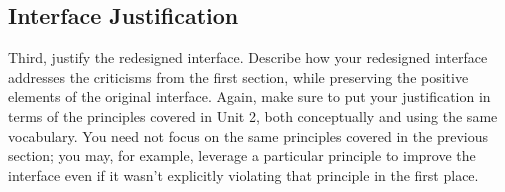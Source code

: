\documentclass[12pt,letterpaper]{article}
\begin{document}
\subsection*{Interface Justification}
Third, justify the redesigned interface. Describe how your redesigned interface addresses the criticisms from the first section, while preserving the positive elements of the original interface. Again, make sure to put your justification in terms of the principles covered in Unit 2, both conceptually and using the same vocabulary. You need not focus on the same principles covered in the previous section; you may, for example, leverage a particular principle to improve the interface even if it wasn’t explicitly violating that principle in the first place.

 

\end{document}
